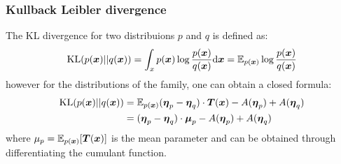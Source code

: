\subsubsection{Kullback Leibler divergence}
The KL divergence for two distribuions $p$ and $q$ is defined as:
$$
\mathrm{KL}(p(\boldsymbol{x}) || q(\boldsymbol{x})) = \int_x p(\boldsymbol{x}) \log \frac{p(\boldsymbol{x})}{q(\boldsymbol{x})} \mbox{\rm d}\boldsymbol{x} 
= \operatorname{\mathbb{E}}_{p(\boldsymbol{x})} \log \frac{p(\boldsymbol{x})}{q(\boldsymbol{x})} 
$$
however for the distributions of the family, one can obtain a closed formula:
\begin{align*}
    \mathrm{KL}(p(\boldsymbol{x}) || q(\boldsymbol{x})) &= \operatorname{\mathbb{E}}_{p(\boldsymbol{x})} (\boldsymbol{\eta}_p - \boldsymbol{\eta}_q) \cdot  \boldsymbol{T}(\boldsymbol{x}) - A(\boldsymbol{\eta}_p) + A(\boldsymbol{\eta}_q) \\
    &= (\boldsymbol{\eta}_p - \boldsymbol{\eta}_q) \cdot  \boldsymbol{\mu}_p - A(\boldsymbol{\eta}_p) + A(\boldsymbol{\eta}_q) \\
\end{align*}
where $\mu_p =\operatorname{\mathbb{E}}_{p(\boldsymbol{x})}[\boldsymbol{T}(\boldsymbol{x})] $ is the mean parameter and can be obtained through differentiating the cumulant function. 

